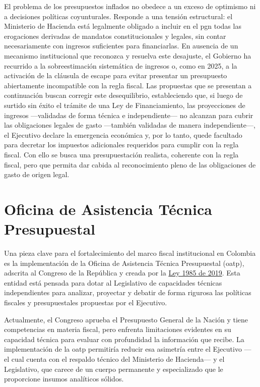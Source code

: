 El problema de los presupuestos inflados no obedece a un exceso de optimismo ni a decisiones políticas coyunturales. Responde a una tensión estructural: el Ministerio de Hacienda está legalmente obligado a incluir en el \gls{pgn} todas las erogaciones derivadas de mandatos constitucionales y legales, sin contar necesariamente con ingresos suficientes para financiarlas. En ausencia de un mecanismo institucional que reconozca y resuelva este desajuste, el Gobierno ha recurrido a la sobreestimación sistemática de ingresos o, como en 2025, a la activación de la cláusula de escape para evitar presentar un presupuesto abiertamente incompatible con la regla fiscal. Las propuestas que se presentan a continuación buscan corregir este desequilibrio, estableciendo que, si luego de surtido sin éxito el trámite de una Ley de Financiamiento, las proyecciones de ingresos —validadas de forma técnica e independiente— no alcanzan para cubrir las obligaciones legales de gasto —también validadas de manera independiente—, el Ejecutivo declare la emergencia económica y, por lo tanto, quede facultado para decretar los impuestos adicionales requeridos para cumplir con la regla fiscal. Con ello se busca una presupuestación realista, coherente con la regla fiscal, pero que permita dar cabida al reconocimiento pleno de las obligaciones de gasto de origen legal.

\section{Oficina de Asistencia Técnica Presupuestal}

Una pieza clave para el fortalecimiento del marco fiscal institucional en Colombia es la implementación de la Oficina de Asistencia Técnica Presupuestal (\gls{oatp}), adscrita al Congreso de la República y creada por la \href{https://www.funcionpublica.gov.co/eva/gestornormativo/norma.php?i=98370}{Ley 1985 de 2019}. Esta entidad está pensada para dotar al Legislativo de capacidades técnicas independientes para analizar, proyectar y debatir de forma rigurosa las políticas fiscales y presupuestales propuestas por el Ejecutivo.

Actualmente, el Congreso aprueba el Presupuesto General de la Nación y tiene competencias en materia fiscal, pero enfrenta limitaciones evidentes en su capacidad técnica para evaluar con profundidad la información que recibe. La implementación de la \gls{oatp} permitiría reducir esa asimetría entre el Ejecutivo — el cual cuenta con el respaldo técnico del Ministerio de Hacienda— y el Legislativo, que carece de un cuerpo permanente y especializado que le proporcione insumos analíticos sólidos.

